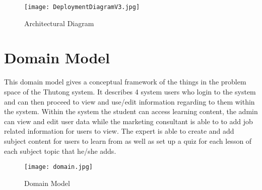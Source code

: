 \documentclass[10pt]{article}
\begin{document}
\begin{figure}
  		\texttt{[image: DeploymentDiagramV3.jpg]}
  		\caption{Architectural Diagram}
  		\label{Architectural Diagram}
	\end{figure}


\section*{Domain Model}
This domain model gives a conceptual framework of the things in the problem space of the Thutong system. It describes 4 system users who login to the system and can then proceed to view and use/edit information regarding to them within the system. Within the system the student can access learning content, the admin can view and edit user data while the marketing consultant is able to to add job related information for users to view. The expert is able to create and add subject content for users to learn from as well as set up a quiz for each lesson of each subject topic that he/she adds.

\pagebreak
	\begin{figure}
  		\texttt{[image: domain.jpg]}
  		\caption{Domain Model}
  		\label{Domain Model}
	\end{figure}
\end{document}
